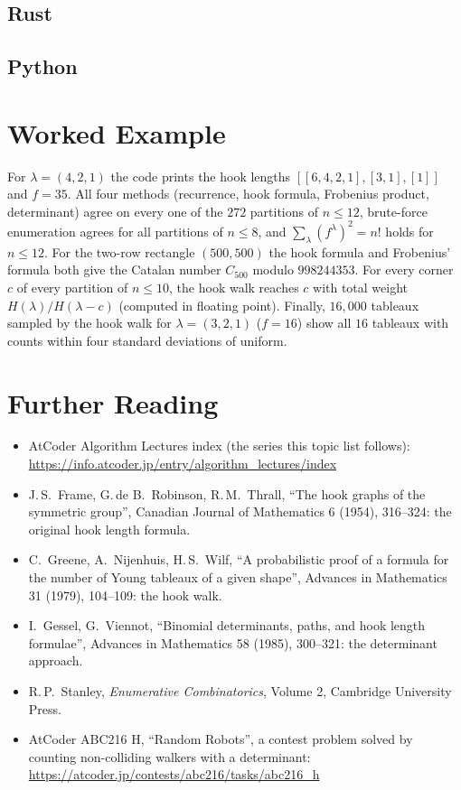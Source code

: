 \documentclass[11pt]{article}
\begin{document}
\codenote
\subsection{Rust}

\subsection{Python}

\section{Worked Example}
\begin{examplebox}
For $\lambda=(4,2,1)$ the code prints the hook lengths $[[6,4,2,1],[3,1],[1]]$ and $f=35$. All four methods (recurrence, hook formula, Frobenius product, determinant) agree on every one of the $272$ partitions of $n\le12$,
brute-force enumeration agrees for all partitions of $n\le8$, and $\sum_\lambda(f^\lambda)^2=n!$ holds for $n\le12$. For the two-row rectangle $(500,500)$ the hook formula and Frobenius' formula both give the
Catalan number $C_{500}$ modulo $998244353$. For every corner $c$ of every partition of $n\le10$, the hook walk reaches $c$ with total weight $H(\lambda)/H(\lambda-c)$ (computed in floating point).
Finally, $16{,}000$ tableaux sampled by the hook walk for $\lambda=(3,2,1)$ ($f=16$) show all $16$ tableaux with counts within four standard deviations of uniform.
\end{examplebox}

\section{Further Reading}
\begin{itemize}[leftmargin=1.5em]
  \item AtCoder Algorithm Lectures index (the series this topic list follows):
        \url{https://info.atcoder.jp/entry/algorithm_lectures/index}
  \item J.\,S.\ Frame, G.\,de B.\ Robinson, R.\,M.\ Thrall, ``The hook graphs of the symmetric group'', Canadian Journal of Mathematics 6 (1954), 316--324: the original hook length formula.
  \item C.\ Greene, A.\ Nijenhuis, H.\,S.\ Wilf, ``A probabilistic proof of a formula for the number of Young tableaux of a given shape'', Advances in Mathematics 31 (1979), 104--109: the hook walk.
  \item I.\ Gessel, G.\ Viennot, ``Binomial determinants, paths, and hook length formulae'', Advances in Mathematics 58 (1985), 300--321: the determinant approach.
  \item R.\,P.\ Stanley, \emph{Enumerative Combinatorics}, Volume 2, Cambridge University Press.
  \item AtCoder ABC216 H, ``Random Robots'', a contest problem solved by counting non-colliding walkers with a determinant:
        \url{https://atcoder.jp/contests/abc216/tasks/abc216_h}
\end{itemize}
\end{document}
